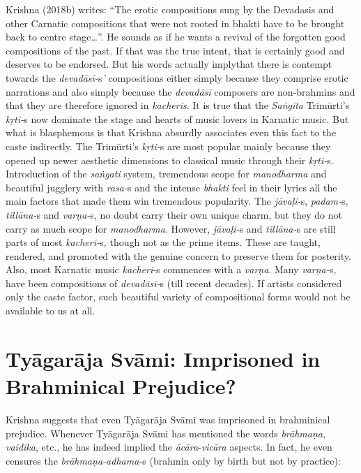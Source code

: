 Krishna (2018b) writes: “The erotic compositions sung by the Devadasis and other Carnatic compositions that were not rooted in bhakti have to be brought back to centre stage…”. He sounds as if he wants a revival of the forgotten good compositions of the past. If that was the true intent, that is certainly good and deserves to be endorsed. But his words actually implythat there is contempt towards the \textit{devadāsī-}s\textit{’} compositions either simply because they comprise erotic narrations and also simply because the \textit{devadāsī} composers are non-brahmins and that they are therefore ignored in \textit{kacheris}. It is true that the \textit{Saṅgīta} Trimūrti’s \textit{kṛti-}s now dominate the stage and hearts of music lovers in Karnatic music. But what is blasphemous is that Krishna absurdly associates even this fact to the caste indirectly. The Trimūrti’s \textit{kṛti-}s are most popular mainly because they opened up newer aesthetic dimensions to classical music through their \textit{kṛti-}s. Introduction of the \textit{saṅgati} system, tremendous scope for \textit{manodharma} and beautiful jugglery with \textit{rasa-}s and the intense \textit{bhakti} feel in their lyrics all the main factors that made them win tremendous popularity. The \textit{jāvaḷi-}s, \textit{padam-}s\textit{, tillāna-}s and \textit{varṇa-}s, no doubt carry their own unique charm, but they do not carry as much scope for \textit{manodharma}. However, \textit{jāvaḷi-}s and \textit{tillāna-}s are still parts of most \textit{kacheri-}s\textit{,} though not as the prime items. These are taught, rendered, and promoted with the genuine concern to preserve them for posterity. Also, most Karnatic music \textit{kacheri}-s commences with a \textit{varṇa}. Many \textit{varṇa-}s\textit{,} have been compositions of \textit{devadāsī-}s (till recent decades). If artists considered only the caste factor, such beautiful variety of compositional forms would not be available to us at all.

\vspace{-.3cm}

\section*{Tyāgarāja Svāmi: Imprisoned in Brahminical Prejudice?}

Krishna suggests that even Tyāgarāja Svāmi was imprisoned in brahminical prejudice. Whenever Tyāgarāja Svāmi has mentioned the words \textit{brāhmaṇa}, \textit{vaidika}, etc., he has indeed implied the \textit{ācāra}-\textit{vicāra} aspects. In fact, he even censures the \textit{brāhmaṇa-adhama-}s (brahmin only by birth but not by practice):

